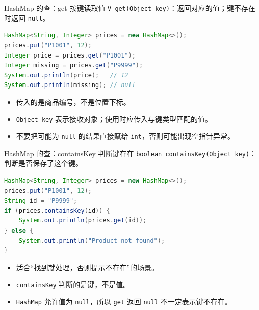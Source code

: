 \documentclass[aspectratio=169]{beamer}
\begin{document}
\begin{frame}[fragile]{HashMap 的查：get 按键读取值}
  \texttt{V get(Object key)}：返回对应的值；键不存在时返回 \texttt{null}。
  \begin{lstlisting}[language=Java]
HashMap<String, Integer> prices = new HashMap<>();
prices.put("P1001", 12);
Integer price = prices.get("P1001");
Integer missing = prices.get("P9999");
System.out.println(price);   // 12
System.out.println(missing); // null
  \end{lstlisting}
  \begin{itemize}
    \item 传入的是商品编号，不是位置下标。
    \item \texttt{Object key} 表示接收对象；使用时应传入与键类型匹配的值。
    \item 不要把可能为 \texttt{null} 的结果直接赋给 \texttt{int}，否则可能出现空指针异常。
  \end{itemize}
\end{frame}

\begin{frame}[fragile]{HashMap 的查：containsKey 判断键存在}
  \texttt{boolean containsKey(Object key)}：判断是否保存了这个键。
  \begin{lstlisting}[language=Java]
HashMap<String, Integer> prices = new HashMap<>();
prices.put("P1001", 12);
String id = "P9999";
if (prices.containsKey(id)) {
    System.out.println(prices.get(id));
} else {
    System.out.println("Product not found");
}
  \end{lstlisting}
  \begin{itemize}
    \item 适合“找到就处理，否则提示不存在”的场景。
    \item \texttt{containsKey} 判断的是键，不是值。
    \item \texttt{HashMap} 允许值为 \texttt{null}，所以 \texttt{get} 返回 \texttt{null} 不一定表示键不存在。
  \end{itemize}
\end{frame}

\end{document}
